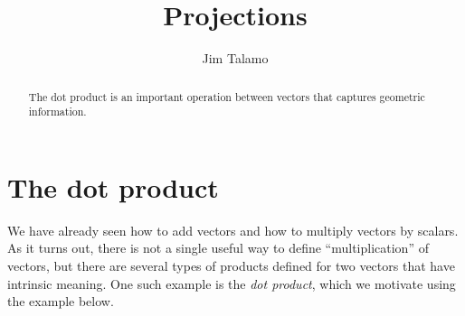 \documentclass{ximera}
\author{Jim Talamo}
\title[Dig-In:]{Projections}
\begin{document}
\begin{abstract}
The dot product is an important operation between vectors that captures geometric information. 
\end{abstract}
\maketitle


\section{The dot product}

We have already seen how to add vectors and how to multiply vectors by
scalars.  As it turns out, there is not a single useful way to define ``multiplication'' of vectors, but there are several types of products defined for two vectors that have intrinsic meaning.  One such example is the \emph{dot product}, which we motivate using the example below.
\end{document}
